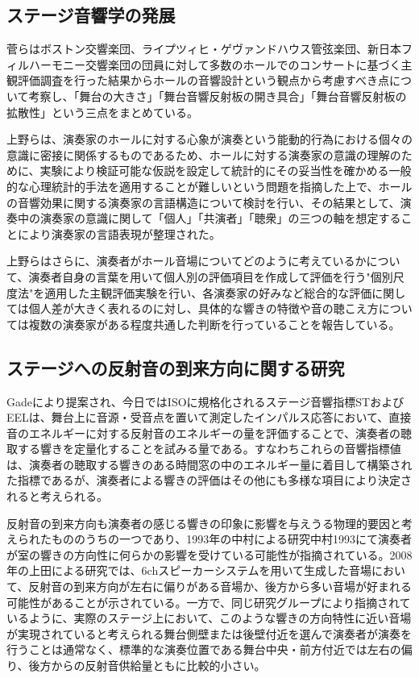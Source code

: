 \documentclass[11pt,a4j]{jreport}
\begin{document}
\newpage
\subsection*{ステージ音響学の発展}

菅ら\cite{suga1995}はボストン交響楽団、ライプツィヒ・ゲヴァンドハウス管弦楽団、新日本フィルハーモニー交響楽団の団員に対して多数のホールでのコンサートに基づく主観評価調査を行った結果からホールの音響設計という観点から考慮すべき点について考察し、「舞台の大きさ」「舞台音響反射板の開き具合」「舞台音響反射板の拡散性」という三点をまとめている。

上野ら\cite{Ueno2003a}は、演奏家のホールに対する心象が演奏という能動的行為における個々の意識に密接に関係するものであるため、ホールに対する演奏家の意識の理解のために、実験により検証可能な仮説を設定して統計的にその妥当性を確かめる一般的な心理統計的手法を適用することが難しいという問題を指摘した上で、ホールの音響効果に関する演奏家の言語構造について検討を行い、その結果として、演奏中の演奏家の意識に関して「個人」「共演者」「聴衆」の三つの軸を想定することにより演奏家の言語表現が整理された。

上野らはさらに、演奏者がホール音場についてどのように考えているかについて、演奏者自身の言葉を用いて個人別の評価項目を作成して評価を行う"個別尺度法"を適用した主観評価実験を行い、各演奏家の好みなど総合的な評価に関しては個人差が大きく表れるのに対し、具体的な響きの特徴や音の聴こえ方については複数の演奏家がある程度共通した判断を行っていることを報告している\cite{Ueno2003a}。


\subsection*{ステージへの反射音の到来方向に関する研究}
Gadeにより提案され、今日ではISOに規格化されるステージ音響指標STおよびEELは、舞台上に音源・受音点を置いて測定したインパルス応答において、直接音のエネルギーに対する反射音のエネルギーの量を評価することで、演奏者の聴取する響きを定量化することを試みる量である。すなわちこれらの音響指標値は、演奏者の聴取する響きのある時間窓の中のエネルギー量に着目して構築された指標であるが、演奏者による響きの評価はその他にも多様な項目により決定されると考えられる。

反射音の到来方向も演奏者の感じる響きの印象に影響を与えうる物理的要因と考えられたもののうちの一つであり、1993年の中村による研究{中村1993}にて演奏者が室の響きの方向性に何らかの影響を受けている可能性が指摘されている。2008年の上田による研究\cite{上田2008}では、6chスピーカーシステムを用いて生成した音場において、反射音の到来方向が左右に偏りがある音場か、後方から多い音場が好まれる可能性があることが示されている。一方で、同じ研究グループにより指摘されているように、実際のステージ上において、このような響きの方向特性に近い音場が実現されていると考えられる舞台側壁または後壁付近を選んで演奏者が演奏を行うことは通常なく、標準的な演奏位置である舞台中央・前方付近では左右の偏り、後方からの反射音供給量ともに比較的小さい\cite{林2008}。
\end{document}

